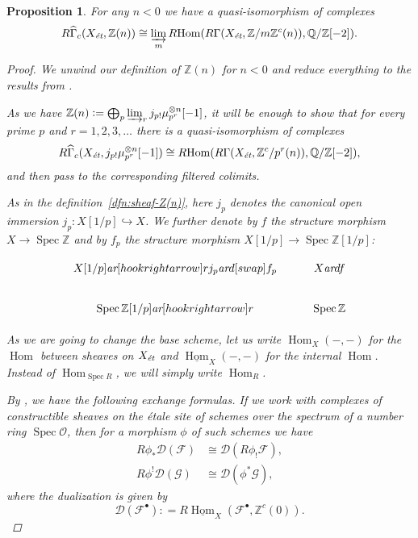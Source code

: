 \documentclass[leqno,12pt]{article}
\theoremstyle{plain}
\newtheorem{proposition}[theorem]{\indent\sc Proposition}
\theoremstyle{definition}
\DeclareMathOperator{\Spec}{Spec}
\DeclareMathOperator{\Hom}{Hom}
\newcommand{\QQ}{\mathbb{Q}}
\newcommand{\ZZ}{\mathbb{Z}}
\newcommand{\dfn}{\mathrel{\mathop:}=}
\newcommand{\ar}{\text{\it ar}}
\newcommand{\et}{\text{\it \'{e}t}}
\newcommand{\iHom}{\underline{\Hom}}
\newcommand{\RHom}{R\!\Hom}
\begin{document}
\begin{proposition}
  For any $n < 0$ we have a quasi-isomorphism of complexes
  \begin{equation}
    \label{eqn:duality-quasi-isomorphism-1}
    R\widehat{\Gamma}_c (X_\et, \ZZ (n)) \cong
    \varinjlim_m \RHom (R\Gamma (X_\et, \ZZ/m\ZZ^c (n)), \QQ/\ZZ [-2]).
  \end{equation}

  \begin{proof}
    We unwind our definition of $\ZZ (n)$ for $n < 0$ and reduce everything to
    the results from \cite{Geisser-2010}.

    \vspace{1em}

    As we have
    $\ZZ (n) \dfn \bigoplus_p \varinjlim_r j_{p!} \mu_{p^r}^{\otimes n} [-1]$,
    it will be enough to show that for every prime $p$ and $r=1,2,3,\ldots$
    there is a quasi-isomorphism of complexes
    \[ R\widehat{\Gamma}_c (X_\et, j_{p!} \mu_{p^r}^{\otimes n} [-1]) \cong
    \RHom (R\Gamma (X_\et, \ZZ^c/p^r (n)), \QQ/\ZZ [-2]), \]
    and then pass to the corresponding filtered colimits.

    As in the definition~\ref{dfn:sheaf-Z(n)}, here $j_p$ denotes the canonical
    open immersion $j_p\colon X[1/p] \hookrightarrow X$. We further denote by
    $f$ the structure morphism $X\to \Spec \ZZ$ and by $f_p$ the structure
    morphism $X [1/p] \to \Spec \ZZ [1/p]$:

    \[ \begin{tikzcd}
      X [1/p]\ar[hookrightarrow]{r}{j_p}\ar{d}[swap]{f_p} & X\ar{d}{f} \\
      \Spec \ZZ [1/p]\ar[hookrightarrow]{r} & \Spec \ZZ
    \end{tikzcd} \]

    As we are going to change the base scheme, let us write $\Hom_X (-,-)$ for
    the $\Hom$ between sheaves on $X_\et$ and $\iHom_X (-,-)$ for the
    internal $\Hom$. Instead of $\Hom_{\Spec R}$, we will simply write
    $\Hom_R$.

    By \cite[Proposition~7.10~(c)]{Geisser-2010}, we have the following
    exchange formulas. If we work with complexes of constructible sheaves on the
    \'{e}tale site of schemes over the spectrum of a number ring
    $\Spec\mathcal{O}$, then for a morphism $\phi$ of such schemes we have
    \begin{align}
      \label{eqn:exchange-formula-1} R \phi_* \mathcal{D} (\mathcal{F}) & \cong \mathcal{D} (R \phi_! \mathcal{F}),\\
      \label{eqn:exchange-formula-2} R \phi^! \mathcal{D} (\mathcal{G}) & \cong \mathcal{D} (\phi^* \mathcal{G}),
    \end{align}
    where the dualization is given by
    \[ \mathcal{D} (\mathcal{F}^\bullet) \dfn
    R\iHom_X (\mathcal{F}^\bullet, \ZZ^c (0)). \]


\end{proof}
\end{proposition}
\end{document}
